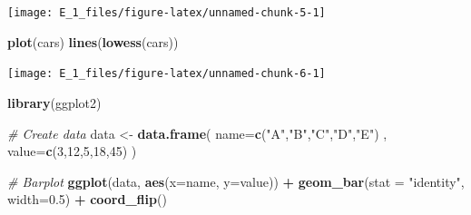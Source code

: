 \documentclass[10pt,]{krantz}
\newenvironment{Shaded}{\begin{snugshade}}{\end{snugshade}}
\newcommand{\CommentTok}[1]{\textcolor[rgb]{0.56,0.35,0.01}{\textit{#1}}}
\newcommand{\DataTypeTok}[1]{\textcolor[rgb]{0.13,0.29,0.53}{#1}}
\newcommand{\DecValTok}[1]{\textcolor[rgb]{0.00,0.00,0.81}{#1}}
\newcommand{\FloatTok}[1]{\textcolor[rgb]{0.00,0.00,0.81}{#1}}
\newcommand{\KeywordTok}[1]{\textcolor[rgb]{0.13,0.29,0.53}{\textbf{#1}}}
\newcommand{\NormalTok}[1]{#1}
\newcommand{\OperatorTok}[1]{\textcolor[rgb]{0.81,0.36,0.00}{\textbf{#1}}}
\newcommand{\OtherTok}[1]{\textcolor[rgb]{0.56,0.35,0.01}{#1}}
\newcommand{\StringTok}[1]{\textcolor[rgb]{0.31,0.60,0.02}{#1}}
\theoremstyle{definition}
\theoremstyle{definition}
\theoremstyle{definition}
\theoremstyle{definition}
\theoremstyle{remark}
\begin{document}
\begin{Shaded}
\end{Shaded}

\begin{center}\texttt{[image: E\_1\_files/figure-latex/unnamed-chunk-5-1]} \end{center}

\begin{Shaded}
\begin{Highlighting}[]
\KeywordTok{plot}\NormalTok{(cars)}
\KeywordTok{lines}\NormalTok{(}\KeywordTok{lowess}\NormalTok{(cars))}
\end{Highlighting}
\end{Shaded}

\begin{center}\texttt{[image: E\_1\_files/figure-latex/unnamed-chunk-6-1]} \end{center}

\begin{Shaded}
\begin{Highlighting}[]
\KeywordTok{library}\NormalTok{(ggplot2)}

\CommentTok{# Create data}
\NormalTok{data <-}\StringTok{ }\KeywordTok{data.frame}\NormalTok{(}
  \DataTypeTok{name=}\KeywordTok{c}\NormalTok{(}\StringTok{"A"}\NormalTok{,}\StringTok{"B"}\NormalTok{,}\StringTok{"C"}\NormalTok{,}\StringTok{"D"}\NormalTok{,}\StringTok{"E"}\NormalTok{) ,  }
  \DataTypeTok{value=}\KeywordTok{c}\NormalTok{(}\DecValTok{3}\NormalTok{,}\DecValTok{12}\NormalTok{,}\DecValTok{5}\NormalTok{,}\DecValTok{18}\NormalTok{,}\DecValTok{45}\NormalTok{)}
\NormalTok{  )}

\CommentTok{# Barplot}
\KeywordTok{ggplot}\NormalTok{(data, }\KeywordTok{aes}\NormalTok{(}\DataTypeTok{x=}\NormalTok{name, }\DataTypeTok{y=}\NormalTok{value)) }\OperatorTok{+}\StringTok{ }
\StringTok{  }\KeywordTok{geom_bar}\NormalTok{(}\DataTypeTok{stat =} \StringTok{"identity"}\NormalTok{, }\DataTypeTok{width=}\FloatTok{0.5}\NormalTok{) }\OperatorTok{+}
\StringTok{  }\KeywordTok{coord_flip}\NormalTok{()}
\end{Highlighting}
\end{Shaded}
\end{document}
